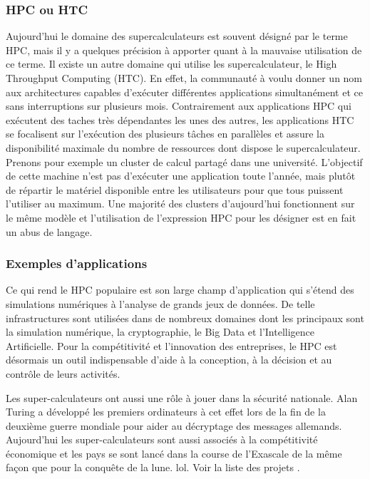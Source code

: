         
        \subsubsection{HPC ou HTC}
            
            Aujourd'hui le domaine des supercalculateurs est souvent désigné par le terme HPC, mais il y a quelques précision à apporter quant à la mauvaise utilisation de ce terme. Il existe un autre domaine qui utilise les supercalculateur, le High Throughput Computing (HTC). En effet, la communauté à voulu donner un nom aux architectures capables d'exécuter différentes applications simultanément et ce sans interruptions sur plusieurs mois. Contrairement aux applications HPC qui exécutent des taches très dépendantes les unes des autres, les applications HTC se focalisent sur l'exécution des plusieurs tâches en parallèles et assure la disponibilité maximale du nombre de ressources dont dispose le supercalculateur. Prenons pour exemple un cluster de calcul partagé dans une université. L'objectif de cette machine n'est pas d'exécuter une application toute l'année, mais plutôt de répartir le matériel disponible entre les utilisateurs pour que tous puissent l'utiliser au maximum. Une majorité des clusters d'aujourd'hui fonctionnent sur le même modèle et l'utilisation de l'expression HPC pour les désigner est en fait un abus de langage.


        \subsubsection{Exemples d'applications}

       
            Ce qui rend le HPC populaire est son large champ d’application qui s’étend des simulations numériques à l’analyse de grands jeux de données.  De telle infrastructures sont utilisées dans de nombreux domaines dont les principaux sont la simulation numérique, la cryptographie, le Big Data et l’Intelligence Artificielle. Pour la compétitivité et l'innovation des entreprises, le HPC est désormais un outil indispensable d'aide à la conception, à la décision et au contrôle de leurs activités.
            
            Les super-calculateurs ont aussi une rôle à jouer dans la sécurité nationale. Alan Turing a développé les premiers ordinateurs à cet effet lors de la fin de la deuxième guerre mondiale pour aider au décryptage des messages allemands. Aujourd’hui les super-calculateurs sont aussi associés à la compétitivité économique et les pays se sont lancé dans la course de l’Exascale de la même façon que pour la conquête de la lune. lol. Voir la liste des projets \cite{Reed2015}.







  
        
    
  
 







